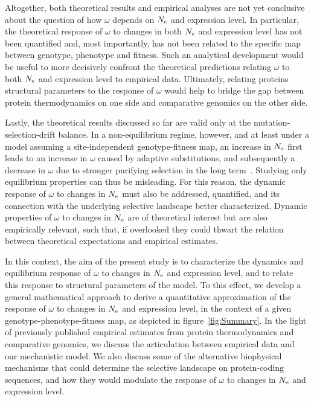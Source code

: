 Altogether, both theoretical results and empirical analyses are not yet conclusive about the question of how $\omega$ depends on $N_{\text{e}}$ and expression level.
In particular, the theoretical response of $\omega$ to changes in both $N_{\text{e}}$ and expression level has not been quantified and, most importantly, has not been related to the specific map between genotype, {phenotype} and fitness.
Such an analytical development would be useful to more decisively confront the theoretical predictions relating $\omega$ to both $N_{\text{e}}$ and expression level to empirical data.
Ultimately, relating proteins structural parameters to the response of $\omega$ would help to bridge the gap between protein thermodynamics on one side and comparative genomics on the other side.

Lastly, the theoretical results discussed so far are valid only at the mutation-selection-drift balance.
In a non-equilibrium regime, however, and at least under a model assuming a site-independent genotype-fitness map, an increase in $N_{\text{e}}$ first leads to an increase in $\omega$ caused by adaptive {substitutions}, and subsequently a decrease in $\omega$ due to stronger purifying selection in the long term~\citep{Jones2016}.
Studying only equilibrium properties can thus be misleading.
For this reason, the dynamic response of $\omega$ to changes in $N_{\text{e}}$ must also be addressed, quantified, and its connection with the underlying selective landscape better characterized.
Dynamic properties of $\omega$ to changes in $N_{\text{e}}$ are of theoretical interest but are also empirically relevant, such that, if overlooked they could thwart the relation between theoretical expectations and empirical estimates.

In this context, the aim of the present study is to characterize the dynamics and equilibrium response of $\omega$ to changes in $N_{\text{e}}$ and expression level, and to relate this response to structural parameters of the model.
To this effect, we develop a general mathematical approach to derive a quantitative approximation of the response of $\omega$ to changes in $N_{\text{e}}$ and expression level, in the context of a given genotype-phenotype-fitness map, as depicted in figure~\ref{fig:Summary}.
In the light of previously published empirical estimates from protein thermodynamics and comparative genomics, we discuss the articulation between empirical data and our mechanistic model.
We also discuss some of the alternative biophysical mechanisms that could determine the selective landscape on protein-coding sequences, and how they would modulate the response of $\omega$ to changes in $N_{\text{e}}$ and expression level.


